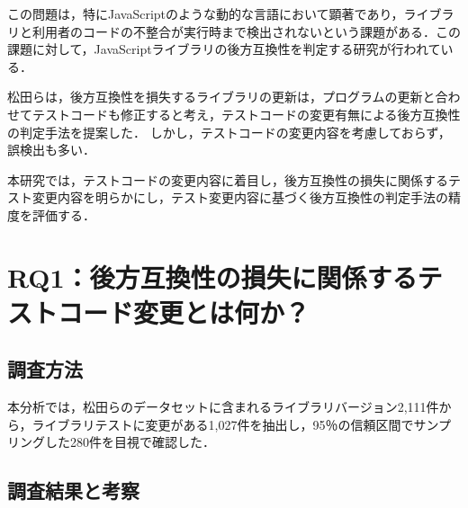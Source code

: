 \documentclass[T,J]{fose} %
\begin{document}


この問題は，特にJavaScriptのような動的な言語において顕著であり，ライブラリと利用者のコードの不整合が実行時まで検出されないという課題がある．この課題に対して，JavaScriptライブラリの後方互換性を判定する研究が行われている．

松田らは，後方互換性を損失するライブラリの更新は，プログラムの更新と合わせてテストコードも修正すると考え，テストコードの変更有無による後方互換性の判定手法を提案した．
\cite{matsuda}
しかし，テストコードの変更内容を考慮しておらず，誤検出も多い．

本研究では，テストコードの変更内容に着目し，後方互換性の損失に関係するテスト変更内容を明らかにし，テスト変更内容に基づく後方互換性の判定手法の精度を評価する．


\section{RQ1：後方互換性の損失に関係するテストコード変更とは何か？}\label{rq1}

\subsection{調査方法}

本分析では，松田らのデータセットに含まれるライブラリバージョン2,111件から，ライブラリテストに変更がある1,027件を抽出し，95％の信頼区間でサンプリングした280件を目視で確認した．


\subsection{調査結果と考察}
\end{document}
